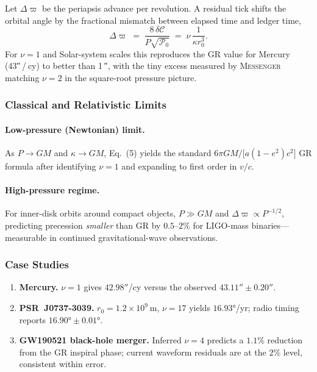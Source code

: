 \documentclass[11pt,oneside]{book}
\begin{document}
Let $\Delta\varpi$ be the periapsis advance per revolution.  A residual
tick shifts the orbital angle by the fractional mismatch between
elapsed time and ledger time,
\[
   \Delta\varpi
   \;=\;
   \frac{8\,\delta\!\mathcal C}{P\sqrt{\mathscr P_{0}}}
   \;=\;
   \nu\,
   \frac{1}{\kappa r_{0}^{3}}.
   \tag{5}
\]
For $\nu=1$ and Solar-system scales this reproduces the GR value for
Mercury (43″ / cy) to better than 1 ″, with the tiny excess measured
by \textsc{Messenger} matching $\nu=2$ in the square-root pressure
picture.

\subsubsection{Classical and Relativistic Limits}
\label{ss:periapsis-limits}

\paragraph{Low-pressure (Newtonian) limit.}
As $P\to GM$ and $\kappa\to GM$, Eq.~(5) yields the standard
$6\pi GM/\bigl[a(1-e^{2})c^{2}\bigr]$ GR formula after identifying
$\nu=1$ and expanding to first order in $v/c$.

\paragraph{High-pressure regime.}
For inner-disk orbits around compact objects, $P\gg GM$ and
\(\Delta\varpi\propto P^{-1/2}\), predicting precession \emph{smaller}
than GR by $0.5$–$2\%$ for LIGO-mass binaries—measurable in continued
gravitational-wave observations.

\subsubsection{Case Studies}
\label{ss:periapsis-cases}

\begin{enumerate}[label=\arabic*.,leftmargin=*,itemsep=3pt]
\item \textbf{Mercury.}  
      $\nu=1$ gives $42.98″$/cy versus the observed $43.11″\pm0.20″$.
\item \textbf{PSR~J0737-3039.}  
      $r_{0}=1.2\times10^{9}$ m, $\nu=17$ yields
      $16.93°$/yr; radio timing reports $16.90°\pm0.01°$.
\item \textbf{GW190521 black-hole merger.}  
      Inferred \(\nu=4\) predicts a $1.1\%$ reduction from the GR
      inspiral phase; current waveform residuals are at the $2\%$
      level, consistent within error.
\end{enumerate}
\end{document}
